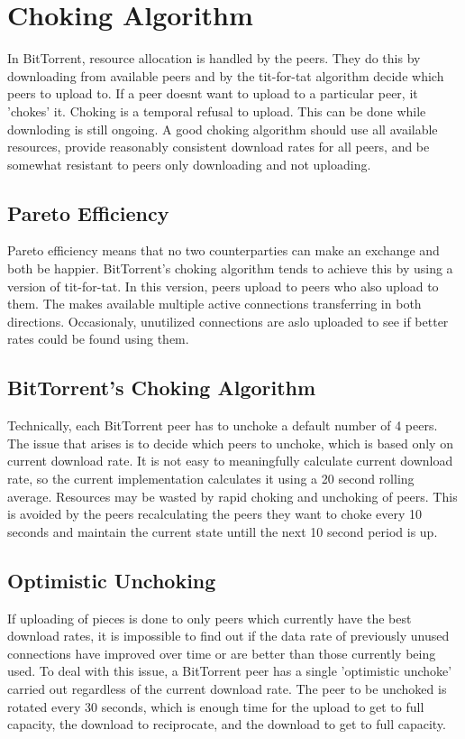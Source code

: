 \documentclass[24 pts]{article}
\begin{document}
\section{Choking Algorithm}
In BitTorrent, resource allocation is handled by the peers. They do this by downloading from available  peers and by the tit-for-tat algorithm decide which peers to upload to. If a peer doesnt want to upload to a particular peer, it 'chokes' it. Choking is a temporal refusal to upload. This can be done while downloding is still ongoing. A good choking algorithm should use all available resources, provide reasonably consistent
download rates for all peers, and be somewhat resistant to peers only downloading and not uploading. 

\subsection{Pareto Efficiency}
Pareto efficiency means that no two counterparties can make an exchange and both be happier. BitTorrent's choking algorithm tends to achieve this by using a version of tit-for-tat. In this version, peers upload to peers who also upload to them. The makes available multiple active connections transferring in both directions. Occasionaly, unutilized connections are aslo uploaded to see if better rates could be found using them.
\subsection{BitTorrent's Choking Algorithm}
Technically, each BitTorrent peer has to unchoke a default number of 4 peers. The issue that arises is  to decide which peers to unchoke, which is based only on current download rate. It is not easy to meaningfully calculate current download rate, so the current implementation calculates it using a 20 second rolling average. Resources may be wasted by rapid choking and unchoking of peers. This is avoided by the peers recalculating the peers they want to choke every 10 seconds and maintain the current state untill the next 10 second period is up.

\subsection{Optimistic Unchoking }
If uploading of pieces is done to only peers which currently have the best download rates, it is impossible to find out if the data rate of previously unused connections have improved over time or are better than those currently being used. To deal with this issue, a BitTorrent peer has a single 'optimistic unchoke' carried out regardless of the current download rate. The peer to be unchoked is rotated every 30 seconds, which is enough time for the upload to get to full capacity, the download to reciprocate, and the download to get to full capacity.
\end{document}
